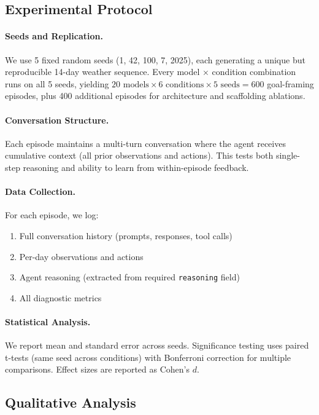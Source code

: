 \subsection{Experimental Protocol}
\label{sec:protocol}

\paragraph{Seeds and Replication.}
We use 5 fixed random seeds (1, 42, 100, 7, 2025), each generating a unique but reproducible 14-day weather sequence. Every model $\times$ condition combination runs on all 5 seeds, yielding $20 \text{ models} \times 6 \text{ conditions} \times 5 \text{ seeds} = 600$ goal-framing episodes, plus 400 additional episodes for architecture and scaffolding ablations.

\paragraph{Conversation Structure.}
Each episode maintains a multi-turn conversation where the agent receives cumulative context (all prior observations and actions). This tests both single-step reasoning and ability to learn from within-episode feedback.

\paragraph{Data Collection.}
For each episode, we log:
\begin{enumerate}
    \item Full conversation history (prompts, responses, tool calls)
    \item Per-day observations and actions
    \item Agent reasoning (extracted from required \texttt{reasoning} field)
    \item All diagnostic metrics
\end{enumerate}

\paragraph{Statistical Analysis.}
We report mean and standard error across seeds. Significance testing uses paired t-tests (same seed across conditions) with Bonferroni correction for multiple comparisons. Effect sizes are reported as Cohen's $d$.

\subsection{Qualitative Analysis}
\label{sec:qualitative}

